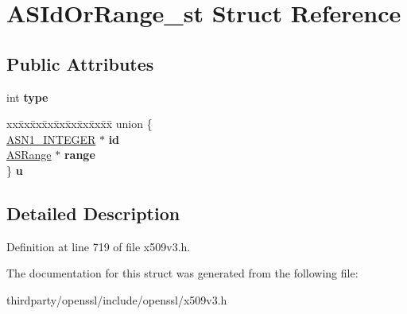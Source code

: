 \hypertarget{struct_a_s_id_or_range__st}{}\section{A\+S\+Id\+Or\+Range\+\_\+st Struct Reference}
\label{struct_a_s_id_or_range__st}
\subsection*{Public Attributes}
\begin{DoxyCompactItemize}
\item 
\mbox{\label{struct_a_s_id_or_range__st_a6abc25c7fdb4a6799aad3531067e9ec9}} 
int {\bfseries type}
\item 
\mbox{\label{struct_a_s_id_or_range__st_ae743462ecb4a3936022c77091bf4705d}} 
\begin{tabbing}
xx\=xx\=xx\=xx\=xx\=xx\=xx\=xx\=xx\=\kill
union \{\\
\>\hyperlink{structasn1__string__st}{ASN1\_INTEGER} $\ast$ {\bfseries id}\\
\>\hyperlink{struct_a_s_range__st}{ASRange} $\ast$ {\bfseries range}\\
\} {\bfseries u}\\

\end{tabbing}\end{DoxyCompactItemize}


\subsection{Detailed Description}


Definition at line 719 of file x509v3.\+h.



The documentation for this struct was generated from the following file\+:\begin{DoxyCompactItemize}
\item 
thirdparty/openssl/include/openssl/x509v3.\+h\end{DoxyCompactItemize}

